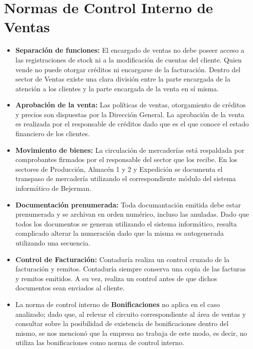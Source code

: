 \pagebreak
\section{Normas de Control Interno de Ventas}
\begin{itemize}
 \item	{\bf Separaci\'on de funciones: } El encargado de ventas no debe poseer acceso a las registraciones de stock ni a la modificaci\'on de cuentas del cliente.
Quien vende no puede otorgar cr\'editos ni encargarse de la facturaci\'on. Dentro del sector de Ventas existe una clara divisi\'on entre la parte encargada de la atenci\'on a los clientes 
y la parte encargada de la venta en s\'i misma.
  \item	{\bf Aprobaci\'on de la venta: } Las pol\'iticas de ventas, otorgamiento de cr\'editos y precios son dispuestas por la Direcci\'on General.
La aprobaci\'on de la venta es realizada por el responsable de cr\'editos dado que es el que conoce el estado financiero de los clientes.
  \item	{\bf Movimiento de bienes: } La circulaci\'on de mercader\'ias est\'a respaldada por comprobantes firmados por el responsable del sector que los recibe. En los sectores de Producci\'on, 
Almac\'en 1 y 2 y Expedici\'on se documenta el transpaso de mercader\'ia utilizando el correspondiente m\'odulo del sistema inform\'atico de Bejerman.
  \item	{\bf Documentaci\'on prenumerada: } Toda documantaci\'on emitida debe estar prenumerada y se archivan en orden num\'erico, incluso las anuladas. Dado que todos los documentos se generan 
utilizando el sistema inform\'atico, resulta complicado alterar la numeraci\'on dado que la misma es autogenerada utilizando una secuencia.
  \item	{\bf Control de Facturaci\'on: } Contadur\'ia realiza un control cruzado de la facturaci\'on y remitos. Contadur\'ia siempre conserva una copia de las facturas y remitos emitidos. 
A su vez, realiza un control antes de que dichos documentos sean enviados al cliente.
  \item La norma de control interno de {\bf Bonificaciones} no aplica en el caso analizado; dado que, al relevar el circuito correspondiente al \'area de ventas y consultar sobre la posibilidad de existencia 
de bonificaciones dentro del mismo, se nos mencion\'o que la empresa no trabaja de este modo, es decir, no utiliza las bonificaciones como norma de control interno.   
\end{itemize}
